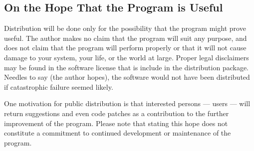 \subsection{On the Hope That the Program is Useful}%

Distribution will be done only for the possibility that the program
might prove useful. The author makes no claim that the program will
suit any purpose, and does not claim that the program will perform
properly or that it will not cause damage to your system, your life,
or the world at large. Proper legal disclaimers may be found in
the software license that is include in the distribution package.
Needles to say (the author hopes), the software would not have been
distributed if catastrophic failure seemed likely.

One motivation for public distribution is that interested persons ---
users --- will return suggestions and even code patches as a
contribution to the further improvement of the program. Please note
that stating this hope does not constitute a commitment to continued
development or maintenance of the program.

